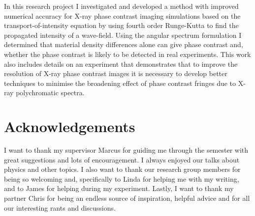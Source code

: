 \documentclass[10pt, a4paper, singlespacing]{report}
\begin{document}
In this research project I investigated and developed a method with improved numerical accuracy for X-ray phase contrast imaging simulations based on the transport-of-intensity equation by using fourth order Runge-Kutta to find the propagated intensity of a wave-field.
Using the angular spectrum formulation I determined that material density differences alone can give phase contrast and, whether the phase contrast is likely to be detected in real experiments. This work also includes details on an experiment that demonstrates that to improve the resolution of X-ray phase contrast images it is necessary to develop better techniques to minimise the broadening effect of phase contrast fringes due to X-ray polychromatic spectra. 


\chapter{Acknowledgements}\label{Acknowledgements}

I want to thank my supervisor Marcus for guiding me through the semester with great suggestions and lots of encouragement. I always enjoyed our talks about physics and other topics. I also want to thank our research group members for being so welcoming and, specifically to Linda for helping me with my writing, and to James for helping during my experiment. Lastly, I want to thank my partner Chris for being an endless source of inspiration, helpful advice and for all our interesting rants and discussions.  

\end{document}
